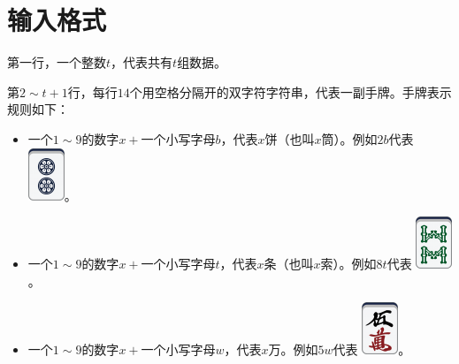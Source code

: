 \documentclass[
	lang=cn,
	color=green
]{elegantbook}
\begin{document}
\section*{输入格式}
第一行，一个整数$t$，代表共有$t$组数据。

第$2 \sim t+1$行，每行$14$个用空格分隔开的双字符字符串，代表一副手牌。手牌表示规则如下：

\begin{itemize}
    \item 一个$1 \sim 9$的数字$x+$一个小写字母$b$，代表$x$饼（也叫$x$筒）。例如$2b$代表 \includegraphics[scale=0.5]{images/mahjong/2p.png}。
    \item 一个$1 \sim 9$的数字$x+$一个小写字母$t$，代表$x$条（也叫$x$索）。例如$8t$代表 \includegraphics[scale=0.5]{images/mahjong/8s.png}。
    \item 一个$1 \sim 9$的数字$x+$一个小写字母$w$，代表$x$万。例如$5w$代表 \includegraphics[scale=0.5]{images/mahjong/5m.png}。

\end{itemize}
\end{document}
